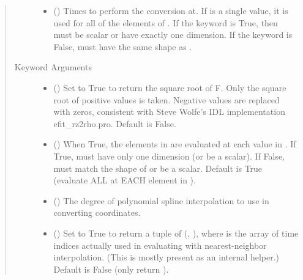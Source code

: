 \documentclass[letterpaper,10pt,english]{sphinxmanual}
\begin{document}
\begin{fulllineitems}
\begin{fulllineitems}
\begin{quote}
\begin{description}
\begin{itemize}
\item {} 
 () \textendash{} Times to perform the conversion at.
If  is a single value, it is used for all of the elements of
. If the  keyword is True, then  must be scalar
or have exactly one dimension. If the  keyword is False,
 must have the same shape as .

\end{itemize}

\item[{Keyword Arguments}] \leavevmode\begin{itemize}
\item {} 
 () \textendash{} Set to True to return the square root of F.
Only the square root of positive values is taken. Negative
values are replaced with zeros, consistent with Steve Wolfe’s
IDL implementation efit\_rz2rho.pro. Default is False.

\item {} 
 () \textendash{} When True, the elements in  are evaluated
at each value in . If True,  must have only one dimension
(or be a scalar). If False,  must match the shape of 
or be a scalar. Default is True (evaluate ALL  at EACH
element in ).

\item {} 
 () \textendash{} The degree of polynomial spline interpolation to
use in converting coordinates.

\item {} 
 () \textendash{} Set to True to return a tuple of (,
), where  is the array of time indices
actually used in evaluating  with nearest-neighbor
interpolation. (This is mostly present as an internal helper.)
Default is False (only return ).


\end{itemize}
\end{description}
\end{quote}
\end{fulllineitems}
\end{fulllineitems}
\end{document}
